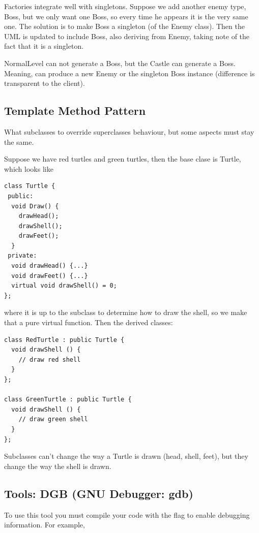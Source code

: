 \documentclass[english, 11pt]{article}
\begin{document}
Factories integrate well with singletons. Suppose we add another enemy type, Boss, but we only want one Boss, so every time he appears it is the very same one. The solution is to make Boss a singleton (of the Enemy class). Then the UML is updated to include Boss, also deriving from Enemy, taking note of the fact that it is a singleton.

\begin{note}
  NormalLevel can not generate a Boss, but the Castle can generate a Boss. Meaning,  can produce a new Enemy or the singleton Boss instance (difference is transparent to the client).
\end{note}

\subsection{Template Method Pattern}

What subclasses to override superclasses behaviour, but some aspects must stay the same.

\begin{exmp}
  Suppose we have red turtles and green turtles, then the base clase is Turtle, which looks like
  \begin{lstlisting}
class Turtle {
 public:
  void Draw() {
    drawHead();
    drawShell();
    drawFeet();
  }
 private:
  void drawHead() {...}
  void drawFeet() {...}
  virtual void drawShell() = 0;
};
  \end{lstlisting}
  where it is up to the subclass to determine how to draw the shell, so we make that a pure virtual function. Then the derived classes:
  \begin{lstlisting}
class RedTurtle : public Turtle {
  void drawShell () {
    // draw red shell
  }
};

class GreenTurtle : public Turtle {
  void drawShell () {
    // draw green shell
  }
};
  \end{lstlisting}
  Subclasses can't change the way a Turtle is drawn (head, shell, feet), but they change the way the shell is drawn.
\end{exmp}

\subsection{Tools: DGB (GNU Debugger: gdb)}

To use this tool you must compile your code with the  flag to enable debugging information. For example,
\end{document}
